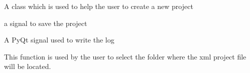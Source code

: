\documentclass[letterpaper,10pt,english]{sphinxmanual}
\begin{document}
\begin{fulllineitems}
\label{\detokenize{index:src_GUI.Main_windows_1.CreateNewProject}}
A class which is used to help the user to create a new project

\begin{fulllineitems}
\label{\detokenize{index:src_GUI.Main_windows_1.CreateNewProject.init_iu}}
\end{fulllineitems}


\begin{fulllineitems}
\label{\detokenize{index:src_GUI.Main_windows_1.CreateNewProject.save_project}}
a signal to save the project

\end{fulllineitems}


\begin{fulllineitems}
\label{\detokenize{index:src_GUI.Main_windows_1.CreateNewProject.send_log}}
A PyQt signal used to write the log

\end{fulllineitems}


\begin{fulllineitems}
\label{\detokenize{index:src_GUI.Main_windows_1.CreateNewProject.setfolder}}
This function is used by the user to select the folder where the xml project file will be located.

\end{fulllineitems}


\end{fulllineitems}

\end{document}
